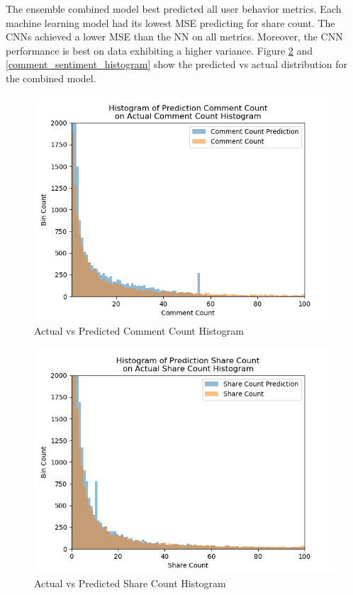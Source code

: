 \documentclass[mksc,blindrev]{informs3} %
\begin{document}
The ensemble combined model best predicted all user behavior metrics. Each machine learning model had its lowest MSE predicting for share count. The CNNs achieved a lower MSE than the NN on all metrics. Moreover, the CNN performance is best on data exhibiting a higher variance. Figure \ref{share_count_histogram} and \ref{comment_sentiment_histogram} show the predicted vs actual distribution for the combined model.

\begin{figure}
\centering
\includegraphics[width=\columnwidth]{images/Comment_Count_Prediction_vs_Actual.png}
\caption{Actual vs Predicted Comment Count Histogram}
\label{comment_count_histogram}
\end{figure}

\begin{figure}
\centering
\includegraphics[width=\columnwidth]{images/Share_Count_Prediction_vs_Actual.png}
\caption{Actual vs Predicted Share Count Histogram}
\label{share_count_histogram}
\end{figure}
\end{document}
